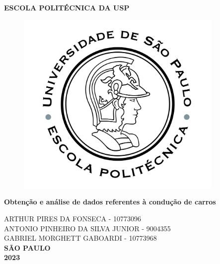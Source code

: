 \thispagestyle{empty}

\vfill
 \begin{center}
    {\large\bfseries ESCOLA POLITÉCNICA DA USP} \\
    \vspace*{1in}
    \begin{figure}[h]
     \centering
            \includegraphics[width=10cm]{figures/Logo_Poli.jpg}\\
     \end{figure}
    \vspace*{1in}
    \large\bfseries Obtenção e análise de dados referentes à condução de carros
    
    \vspace{1.5cm}
    ARTHUR PIRES DA FONSECA - 10773096\\
    ANTONIO PINHEIRO DA SILVA JUNIOR - 9004355\\
    GABRIEL MORGHETT GABOARDI - 10773968\\
    \vfill
    \large\bfseries{ SÃO PAULO \\ 2023}
\end{center}

\normalsize